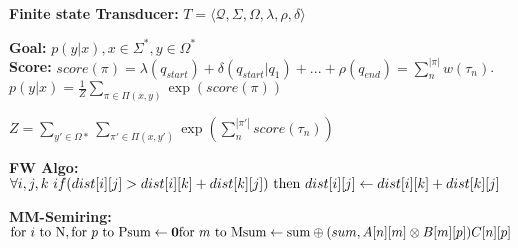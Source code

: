 \textbf{Finite state Transducer:} $T = \langle \mathcal{Q}, \Sigma, \Omega, \lambda, \rho, \delta \rangle$\\
\begin{comment}
	Finite set of states, input vocabulary, output vocabulary, function mapping state to initial scores, function mapping state to final scores, transition function mapping transitions to scores.\\
	There are usually a large number of accepting paths to form y from x, the mapping is therefore ambigous. We focus on the unambiguous case.\\
\end{comment} 

\textbf{Goal:} $p(y|x), x\in \Sigma^*, y\in \Omega^*$\\
\textbf{Score:} $score(\pi) = \lambda(q_{start}) + \delta(q_{start} | q_1) + ... + \rho(q_{end}) = \sum_n^{|\pi|} w(\tau_n)$. $p(y | x) = \frac{1}{Z} \sum_{\pi \in \Pi(x,y)} \exp (score(\pi))$\\
\begin{comment}
	$\pi$ denotes a sequence of state transitions for a sequence given input tokens x xand output tokens y.
	The normalizer Z is again infinite, since there may be loops in the finite state machine.\\
\end{comment}

$Z = \sum_{y' \in \Omega*} \sum_{\pi' \in \Pi(x,y')} \exp (\sum_n^{|\pi'|} score(\tau_n))$



\textbf{FW Algo:} $\forall i,j,k \text{ } if(dist[i][j] > dist[i][k] + dist[k][j])\\\text{ then } dist[i][j] \leftarrow dist[i][k] + dist[k][j]$\\
\begin{comment}
	Finds shortest paths between all pairs of vertices, thereby the transitive closure of a graph, in $O(n^3)$.\\
\end{comment} 

\textbf{MM-Semiring:} $\text{for } i \text{ to N}, \text{for } p \text{ to P} \\
\text{sum}\leftarrow \textbf{0}\\
\text{for } m \text{ to M}\\ 
\text{sum}\leftarrow \text{sum} \oplus (sum,A[n][m] \otimes B[m][p])\\
C[n][p]$\\
\begin{comment}
	In the second loop, we initialize a sum with $\bar{0}$, which is written to $C[i][j]$.
	Depending on the semiring, this sum captures different properties of the weighted graph.\\
\end{comment} 

